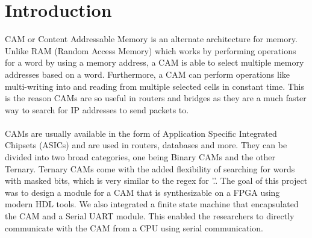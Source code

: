 \section{Introduction}
CAM or Content Addressable Memory is an alternate architecture for memory. Unlike RAM (Random Access Memory) which works by 
performing operations for a word by using a memory address, a CAM is able to select multiple memory addresses based on a word. 
Furthermore, a CAM can perform operations like multi-writing into and reading from multiple selected cells in constant time.
This is the reason CAMs are so useful in routers and bridges as they are a much faster way to search for IP addresses to send packets to.
\\\\  
CAMs are usually available in the form of Application Specific Integrated Chipsets (ASICs) and are used in routers, databases and more.
They can be divided into two broad categories, one being Binary CAMs and the other Ternary. 
Ternary CAMs come with the added flexibility of searching for words with masked bits, which is very similar to the regex for '.'. 
The goal of this project was to design a module for a CAM that is synthesizable on a FPGA using modern HDL tools. 
We also integrated a finite state machine that encapsulated the CAM and a Serial UART module. 
This enabled the researchers to directly communicate with the CAM from a CPU using serial communication. 
